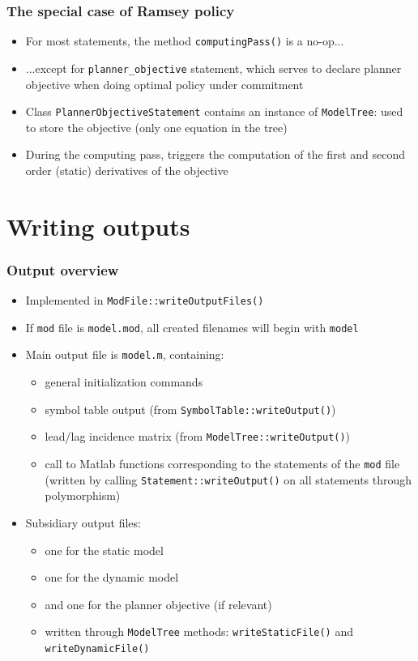 \documentclass{beamer}
\begin{document}
\begin{frame}
  \frametitle{The special case of Ramsey policy}
  \begin{itemize}
  \item For most statements, the method \texttt{computingPass()} is a no-op...
  \item ...except for \texttt{planner\_objective} statement, which serves to declare planner objective when doing optimal policy under commitment
  \item Class \texttt{PlannerObjectiveStatement} contains an instance of \texttt{ModelTree}: used to store the objective (only one equation in the tree)
  \item During the computing pass, triggers the computation of the first and second order (static) derivatives of the objective
  \end{itemize}
\end{frame}

\section{Writing outputs}

\begin{frame}
  \frametitle{Output overview}
  \begin{itemize}
  \item Implemented in \texttt{ModFile::writeOutputFiles()}
  \item If \texttt{mod} file is \texttt{model.mod}, all created filenames will begin with \texttt{model}
  \item Main output file is \texttt{model.m}, containing:
    \begin{itemize}
    \item general initialization commands
    \item symbol table output (from \texttt{SymbolTable::writeOutput()})
    \item lead/lag incidence matrix (from \texttt{ModelTree::writeOutput()})
    \item call to Matlab functions corresponding to the statements of the \texttt{mod} file (written by calling \texttt{Statement::writeOutput()} on all statements through polymorphism)
    \end{itemize}
  \item Subsidiary output files:
    \begin{itemize}
    \item one for the static model
    \item one for the dynamic model
    \item and one for the planner objective (if relevant)
    \item written through \texttt{ModelTree} methods: \texttt{writeStaticFile()} and \texttt{writeDynamicFile()}
    \end{itemize}
  \end{itemize}
\end{frame}
\end{document}
